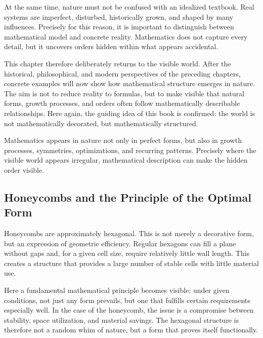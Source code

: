 At the same time, nature must not be confused with an idealized textbook.
Real systems are imperfect,
disturbed,
historically grown,
and shaped by many influences.
Precisely for this reason, it is important
to distinguish between mathematical model and concrete reality.
Mathematics does not capture every detail,
but it uncovers orders
hidden within what appears accidental.

This chapter therefore deliberately returns to the visible world.
After the historical,
philosophical,
and modern perspectives of the preceding chapters,
concrete examples will now show
how mathematical structure emerges in nature.
The aim is not
to reduce reality to formulas,
but to make visible
that natural forms,
growth processes,
and orders often follow mathematically describable relationships.
Here again, the guiding idea of this book is confirmed:
the world is not mathematically decorated,
but mathematically structured.

\begin{DidacticBox}
	\label{box:nature-structure}
	Mathematics appears in nature not only in perfect forms,
	but also in growth processes,
	symmetries,
	optimizations,
	and recurring patterns.
	Precisely where the visible world appears irregular,
	mathematical description can make the hidden order visible.
\end{DidacticBox}


\subsection{Honeycombs and the Principle of the Optimal Form}

Honeycombs are approximately hexagonal.
This is not merely a decorative form,
but an expression of geometric efficiency.
Regular hexagons can fill a plane without gaps
and, for a given cell size, require relatively little wall length.
This creates a structure
that provides a large number of stable cells
with little material use.

Here a fundamental mathematical principle becomes visible:
under given conditions, not just any form prevails,
but one
that fulfills certain requirements especially well.
In the case of the honeycomb, the issue is a compromise between stability,
space utilization,
and material savings.
The hexagonal structure is therefore not a random whim of nature,
but a form
that proves itself functionally.

